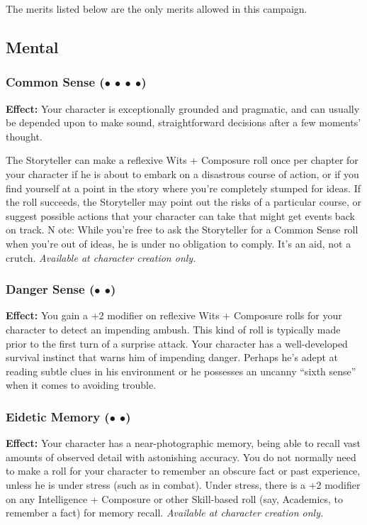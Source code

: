 \documentclass["../Misguided by Starlight.tex"]{subfiles}
\begin{document}

The merits listed below are the only merits allowed in this campaign.

\subsection{Mental}
	\subsubsection{Common Sense ($\bullet$ $\bullet$ $\bullet$ $\bullet$)} %
		\textbf{Effect:} Your character is exceptionally grounded and pragmatic, and can usually be depended upon to make sound, straightforward decisions after a few moments' thought.
		
		The Storyteller can make a reflexive Wits + Composure roll once per chapter for your character if he is about to embark on a disastrous course of action, or if you find yourself at a point in the story where you're completely stumped for ideas. If the roll succeeds, the Storyteller may point out the risks of a particular course, or suggest possible actions that your character can take that might get events back on track. N ote: While you're free to ask the Storyteller for a Common Sense roll when you're out of ideas, he is under no obligation to comply. It's an aid, not a crutch. \emph{Available at character creation only.}
		
	\subsubsection{Danger Sense ($\bullet$ $\bullet$)} %
		\textbf{Effect:} You gain a +2 modifier on reflexive Wits + Composure rolls for your character to detect an impending ambush. This kind of roll is typically made prior to the first turn of a surprise attack. Your character has a well-developed survival instinct that warns him of impending danger. Perhaps he's adept at reading subtle clues in his environment or he possesses an uncanny ``sixth sense'' when it comes to avoiding trouble.
	
	\subsubsection{Eidetic Memory ($\bullet$ $\bullet$)} %
		\textbf{Effect:} Your character has a near-photographic memory, being able to recall vast amounts of observed detail with astonishing accuracy. You do not normally need to make a roll for your character to remember an obscure fact or past experience, unless he is under stress (such as in combat). Under stress, there is a +2 modifier on any Intelligence + Composure or other Skill-based roll (say, Academics, to remember a fact) for memory recall. \emph{Available at character creation only.}
	
\end{document}
